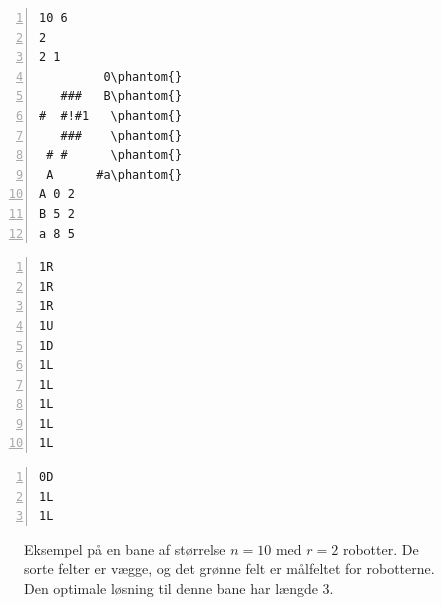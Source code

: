 \documentclass[10pt, a4paper]{article}
\begin{document}
\newsavebox{\simpleboard}
\begin{lrbox}\simpleboard%
\hspace{1cm}
\begin{minipage}[b]{2.1cm}%
\begin{Verbatim}[frame=single, numbers=left, showspaces, commandchars=\\\{\}, baselinestretch=0.64]
10 6
2
2 1
         0\phantom{}
   ###   B\phantom{}
#  #!#1   \phantom{}
   ###    \phantom{}
 # #      \phantom{}
 A      #a\phantom{}
A 0 2
B 5 2
a 8 5
\end{Verbatim}
\end{minipage} 
\hspace{1cm}
\end{lrbox}

\newsavebox{\simpleboardsolution}
\begin{lrbox}\simpleboardsolution%
\hspace{1cm}
\begin{minipage}[b]{2.1cm}%
\begin{Verbatim}[frame=single, numbers=left,showspaces, commandchars=\\\{\}, baselinestretch=0.64, label={\scriptsize Løsning 1}]
1R
1R
1R
1U
1D
1L
1L
1L
1L
1L
\end{Verbatim}
\vspace{-4pt}
\begin{Verbatim}[frame=single, numbers=left,showspaces, commandchars=\\\{\}, baselinestretch=0.64, label={\scriptsize Løsning 2}]
0D
1L
1L
\end{Verbatim}
\end{minipage}
\hspace{1cm}
\end{lrbox}

\begin{figure}
\centering
{}
\hspace{0.2cm}
\hspace{0.2cm}
\caption{Eksempel på en bane af størrelse $n=10$ med $r=2$ robotter. De sorte felter er vægge, og det grønne felt er målfeltet for robotterne. Den optimale løsning til denne bane har længde 3.}
\label{fig:simpleboardexample}
\end{figure}
\end{document}
